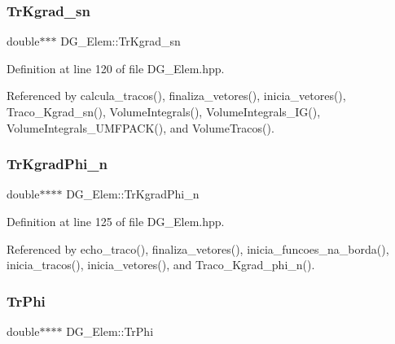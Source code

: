 \mbox{\label{classDG__Elem_aa71a1b860606c8560d0ef2a981580340}} 
\subsubsection{\texorpdfstring{Tr\+Kgrad\+\_\+sn}{TrKgrad\_sn}}
{\footnotesize\ttfamily double$\ast$$\ast$$\ast$ D\+G\+\_\+\+Elem\+::\+Tr\+Kgrad\+\_\+sn\hspace{0.3cm}{\ttfamily [private]}}



Definition at line 120 of file D\+G\+\_\+\+Elem.\+hpp.



Referenced by calcula\+\_\+tracos(), finaliza\+\_\+vetores(), inicia\+\_\+vetores(), Traco\+\_\+\+Kgrad\+\_\+sn(), Volume\+Integrals(), Volume\+Integrals\+\_\+\+I\+G(), Volume\+Integrals\+\_\+\+U\+M\+F\+P\+A\+C\+K(), and Volume\+Tracos().

\mbox{\label{classDG__Elem_a2703c18a4eb102761f135b01958110c6}} 
\subsubsection{\texorpdfstring{Tr\+Kgrad\+Phi\+\_\+n}{TrKgradPhi\_n}}
{\footnotesize\ttfamily double$\ast$$\ast$$\ast$$\ast$ D\+G\+\_\+\+Elem\+::\+Tr\+Kgrad\+Phi\+\_\+n\hspace{0.3cm}{\ttfamily [private]}}



Definition at line 125 of file D\+G\+\_\+\+Elem.\+hpp.



Referenced by echo\+\_\+traco(), finaliza\+\_\+vetores(), inicia\+\_\+funcoes\+\_\+na\+\_\+borda(), inicia\+\_\+tracos(), inicia\+\_\+vetores(), and Traco\+\_\+\+Kgrad\+\_\+phi\+\_\+n().

\mbox{\label{classDG__Elem_ae1432d30cbd7b063fc859a65362ee8bf}} 
\subsubsection{\texorpdfstring{Tr\+Phi}{TrPhi}}
{\footnotesize\ttfamily double$\ast$$\ast$$\ast$$\ast$ D\+G\+\_\+\+Elem\+::\+Tr\+Phi\hspace{0.3cm}{\ttfamily [private]}}



